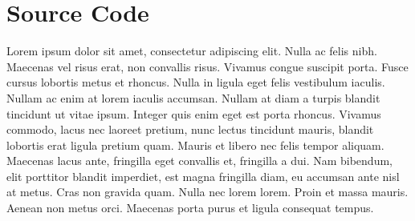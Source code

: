 \documentclass[12pt]{article}
\begin{document}
  \newpage

  \appendix
  \section{Source Code}
    Lorem ipsum dolor sit amet, consectetur adipiscing elit. Nulla ac felis nibh. Maecenas vel risus erat, non convallis risus. Vivamus congue suscipit porta. Fusce cursus lobortis metus et rhoncus. Nulla in ligula eget felis vestibulum iaculis. Nullam ac enim at lorem iaculis accumsan. Nullam at diam a turpis blandit tincidunt ut vitae ipsum. Integer quis enim eget est porta rhoncus. Vivamus commodo, lacus nec laoreet pretium, nunc lectus tincidunt mauris, blandit lobortis erat ligula pretium quam. Mauris et libero nec felis tempor aliquam. Maecenas lacus ante, fringilla eget convallis et, fringilla a dui. Nam bibendum, elit porttitor blandit imperdiet, est magna fringilla diam, eu accumsan ante nisl at metus. Cras non gravida quam. Nulla nec lorem lorem. Proin et massa mauris. Aenean non metus orci. Maecenas porta purus et ligula consequat tempus.
\end{document}
